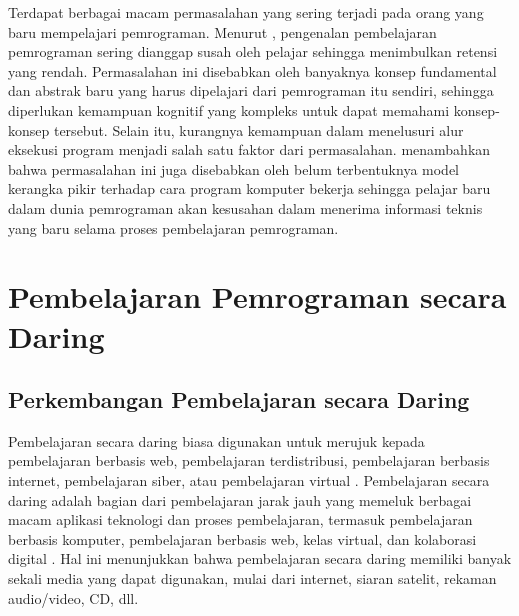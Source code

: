 Terdapat berbagai macam permasalahan yang sering terjadi pada orang yang baru mempelajari pemrograman. Menurut \textcite{moons2013pilot}, pengenalan pembelajaran pemrograman sering dianggap susah oleh pelajar sehingga menimbulkan retensi yang rendah. Permasalahan ini disebabkan oleh banyaknya konsep fundamental dan abstrak baru yang harus dipelajari dari pemrograman itu sendiri, sehingga diperlukan kemampuan kognitif yang kompleks untuk dapat memahami konsep-konsep tersebut. Selain itu, kurangnya kemampuan dalam menelusuri alur eksekusi program menjadi salah satu faktor dari permasalahan. \textcite{mayer1981psychology} menambahkan bahwa permasalahan ini juga disebabkan oleh belum terbentuknya model kerangka pikir terhadap cara program komputer bekerja sehingga pelajar baru dalam dunia pemrograman akan kesusahan dalam menerima informasi teknis yang baru selama proses pembelajaran pemrograman.



\section{Pembelajaran Pemrograman secara Daring}
\subsection{Perkembangan Pembelajaran secara Daring}
Pembelajaran secara daring biasa digunakan untuk merujuk kepada pembelajaran berbasis web, pembelajaran terdistribusi, pembelajaran berbasis internet, pembelajaran siber, atau pembelajaran virtual \parencite{urdan2000elearning}. Pembelajaran secara daring adalah bagian dari pembelajaran jarak jauh yang memeluk berbagai macam aplikasi teknologi dan proses pembelajaran, termasuk pembelajaran berbasis komputer, pembelajaran berbasis web, kelas virtual, dan kolaborasi digital \parencite{urdan2000elearning}. Hal ini menunjukkan bahwa pembelajaran secara daring memiliki banyak sekali media yang dapat digunakan, mulai dari internet, siaran satelit, rekaman audio/video, CD, dll.

